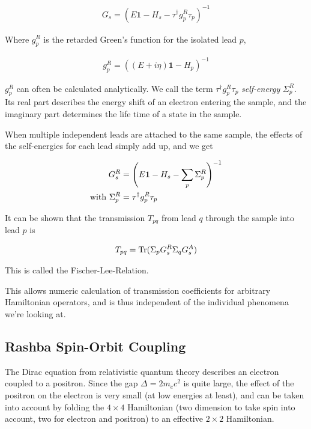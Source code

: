 \documentclass[11pt,twoside]{book}
\newcommand{\trace}{\textnormal{Tr}}
\begin{document}
\begin{align}
    G_s = (E\mathbf1 - H_s - \tau^\dagger g_p^R \tau_p )^{-1}
\end{align}

Where $g_p^R$ is the retarded Green's function for the isolated lead $p$,

\begin{align}
    g_p^R = ((E+i\eta)\mathbf1 - H_p)^{-1}
\end{align}

$g_p^R$ can often be calculated analytically. We call the term $\tau^\dagger
g_p^R \tau_p$ \emph{self-energy} $\Sigma^R_p$. Its real part describes the
energy shift of an electron entering the sample, and the imaginary part
determines the life time of a state in the sample.

When multiple independent leads are attached
to the same sample, the effects of the self-energies for each lead simply add
up, and we get

\begin{align}
    G_s^R &= \left(E\mathbf1 - H_s - \sum_p \Sigma^R_p\right)^{-1} \\
    \textnormal{with } \Sigma^R_p &= \tau^\dagger g_p^R \tau_p
\end{align}

It can be shown \cite{fischer-lee,baranger} that the transmission $T_{pq}$ from lead
$q$ through the sample into lead $p$ is

\begin{align}
    T_{pq} = \trace(\Sigma_p G_s^R \Sigma_q G_s^A)
\end{align}

This is called the Fischer-Lee-Relation.

This allows numeric calculation of transmission coefficients for
arbitrary Hamiltonian operators, and is thus independent of the individual
phenomena we're looking at.

\subsection*{Rashba Spin-Orbit Coupling}

The Dirac equation from relativistic quantum theory describes an electron
coupled to a positron. Since the gap $\Delta = 2 m_e c^2$ is quite large, the
effect of the positron on the electron is very small (at low energies at
least), and can be
taken into account by folding the $4\times4$ Hamiltonian (two dimension to
take spin into account, two for electron and positron) to an effective
$2\times 2$ Hamiltonian.
\end{document}
